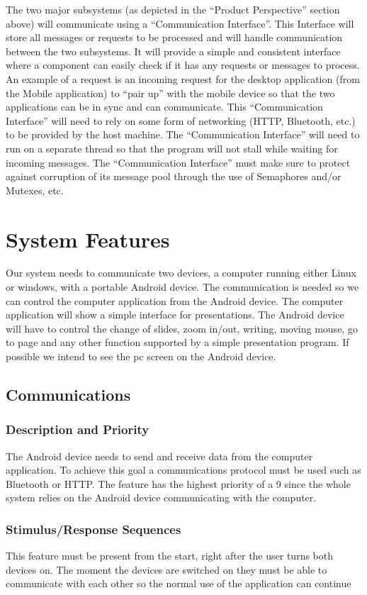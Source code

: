 \documentclass{article}
\begin{document}
The two major subsystems (as depicted in the “Product Perspective” section above) will communicate using a “Communication Interface”. This Interface will store all messages or requests to be processed and will handle communication between the two subsystems. It will provide a simple and consistent interface where a component can easily check if it has any requests or messages to process. An example of a request is an incoming request for the desktop application (from the Mobile application) to “pair up” with the mobile device so that the two applications can be in sync and can communicate. This “Communication Interface” will need to rely on some form of networking (HTTP, Bluetooth, etc.) to be provided by the host machine. The “Communication Interface” will need to run on a separate thread so that the program will not stall while waiting for incoming messages. The “Communication Interface” must make sure to protect against corruption of its message pool through the use of Semaphores and/or Mutexes, etc.

\newpage
\section{System Features}
Our system needs to communicate two devices, a computer running either Linux or windows, with a portable Android device. The communication is needed so we can control the computer application from the Android device. The computer application will show a simple interface for presentations. The Android device will have to control the change of slides, zoom in/out, writing, moving mouse, go to page and any other function supported by a simple presentation program. If possible we intend to see the pc screen on the Android device. 

\subsection{Communications}
\subsubsection{Description and Priority}
The Android device needs to send and receive data from the computer application. To achieve this goal a communications protocol must be used such as Bluetooth or HTTP. The feature has the highest priority of a 9 since the whole system relies on the Android device communicating with the computer.
\subsubsection{Stimulus/Response Sequences}
This feature must be present from the start, right after the user turns both devices on.  The moment the devices are switched on they must be able to communicate with each other so the normal use of the application can continue
\end{document}
